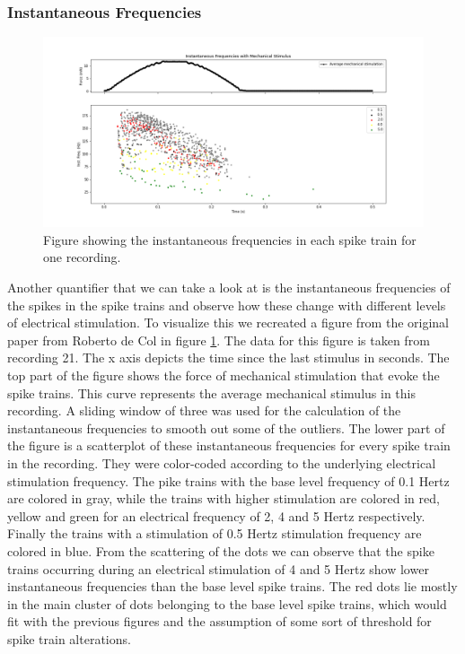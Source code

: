 \subsubsection{Instantaneous Frequencies}
\begin{figure}
	\includegraphics[width = \textwidth]{src/pic/11_12_13U1b_inst_freqs}
	\caption{Figure showing the instantaneous frequencies in each spike train for one recording.}
	\label{fig:inst_freqs}
\end{figure}
Another quantifier that we can take a look at is the instantaneous frequencies of the spikes in the spike trains and observe how these change with different levels of electrical stimulation. To visualize this we recreated a figure from the original paper from Roberto de Col in figure \ref{fig:inst_freqs}. The data for this figure is taken from recording 21. The x axis depicts the time since the last stimulus in seconds. The top part of the figure shows the force of mechanical stimulation that evoke the spike trains. This curve represents the average mechanical stimulus in this recording. A sliding window of three was used for the calculation of the instantaneous frequencies to smooth out some of the outliers. The lower part of the figure is a scatterplot of these instantaneous frequencies for every spike train in the recording. They were color-coded according to the underlying electrical stimulation frequency. The pike trains with the base level frequency of 0.1 Hertz are colored in gray, while the trains with higher stimulation are colored in red, yellow and green for an electrical frequency of 2, 4 and 5 Hertz respectively. Finally the trains with a stimulation of 0.5 Hertz stimulation frequency are colored in blue. From the scattering of the dots we can observe that the spike trains occurring during an electrical stimulation of 4 and 5 Hertz show lower instantaneous frequencies than the base level spike trains. The red dots lie mostly in the main cluster of dots belonging to the base level spike trains, which would fit with the previous figures and the assumption of some sort of threshold for spike train alterations.

